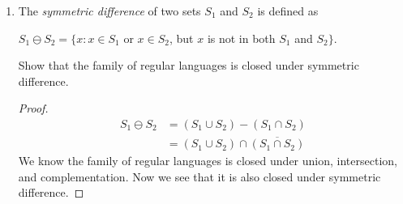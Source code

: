 \documentclass[]{book}
\theoremstyle{definition}
\begin{document}
\begin{enumerate}
    \begin{proof}
        Induction on $n$ to show that if $L_1$, $L_2$, ..., $L_n$ are regular,
        $L_U = \cup_{i=\{1, 2, ...n\}} L_i$ is also regular. \par
        \underline{Base case}: If $n = 1$, the expanded right side is $L_1$ and it is regular.
        So the argument holds when $n = 1$, now we have a base case. \par
        \underline{Inductive step}: Let $k \geq 1$ be an arbitrary natural number.\\
        Let assume the induction hypothesis: the argument holds for all values of $n$ up to
        some $k$. \\
        Then, with $n = n + 1$, $L_U = \displaystyle\bigcup_{i=\{1, 2, .., n+1\}} L_i$
        $= \displaystyle\bigcup_{i=\{1, 2, .., n\}} L_i \cup L_{n+1}$.
        From the latest formula, the left operand of $\cup$ is regular by inductive hypothesis,
        and the right operand is also regular immediately by the argument.
        Since the family of regular languages are closed under union, now we see
        that the argument holds for $n = n + 1$, consequently holds for any arbitrary $n$,
        $n \geq 1$.
    \end{proof}
    
    Showing that the family of regular languages is closed under finite intersection will
    taken easy as above.
    
\item
    The \textit{symmetric difference} of two sets $S_1$ and $S_2$ is defined as
    \begin{center}
        $S_1 \ominus S_2 = \{x: x \in S_1$ or $x \in S_2$, but $x$ is not in both
        $S_1$ and $S_2\}$.
    \end{center}
    Show that the family of regular languages is closed under symmetric difference.
    
    \begin{proof}
        \begin{equation*}
        \begin{split}
            S_1 \ominus S_2 & = (S_1 \cup S_2) - (S_1 \cap S_2) \\
            & = (S_1 \cup S_2) \cap \overline{(S_1 \cap S_2)}
        \end{split}
        \end{equation*}
        We know the family of regular languages is closed under union,
        intersection, and complementation. Now we see that it is also closed
        under symmetric difference.
    \end{proof}
    
\end{enumerate}
\end{document}
